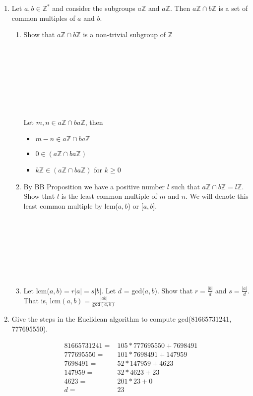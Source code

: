 \documentclass[11pt]{article}
\begin{document}
\begin{enumerate}
\newpage %
\item Let $a, b \in \mathbb{Z}^*$ and consider the subgroups $a\mathbb{Z}$ and $a\mathbb{Z}$.  Then $a\mathbb{Z} \cap b\mathbb{Z}$ is a set of common multiples of $a$ and $b$.
\begin{enumerate}
\item Show that $a\mathbb{Z} \cap b\mathbb{Z}$ is a non-trivial subgroup of $\mathbb{Z}$
\\\\
\\
\\
\\
\\
\\
\\
\\
Let $m,n \in a\mathbb{Z} \cap ba\mathbb{Z}$, then
\begin{itemize}
  \item $m-n \in a\mathbb{Z} \cap ba\mathbb{Z}$
  \item $0 \in (a\mathbb{Z} \cap ba\mathbb{Z})$
  \item $k\mathbb{Z} \in (a\mathbb{Z} \cap ba\mathbb{Z})$ for $k \geq 0$
\end{itemize}
\item By BB Proposition we have a positive number $l$ such that $a\mathbb{Z} \cap b\mathbb{Z} = l\mathbb{Z}$.  Show that $l$ is the least common multiple of $m$ and $n$.  We will denote this least common multiple by lcm($a,b$) or [$a,b$].
\\
\\
\\\\
\\
\\
\\
\\

\item Let lcm($a,b) = r|a| = s|b|$.  Let $d$ = gcd($a,b$).  Show that $r = \tfrac{|b|}{d}$ and $s = \tfrac{|a|}{d}$.  That is, lcm$(a,b) = \tfrac{|ab|}{\mathtt{gcd}(a,b)}$
\end{enumerate}


\newpage %
\item Give the steps in the Euclidean algorithm to compute gcd(81665731241, 777695550).

\begin{align*}
81665731241 =& 105 * 777695550 + 7698491\\
777695550 =& 101 * 7698491 + 147959\\
7698491 =& 52 * 147959 + 4623\\
147959 =& 32 * 4623 + 23\\
4623 =& 201 * 23 + 0\\
d =& 23\\
\end{align*}


\end{enumerate}
\end{document}
